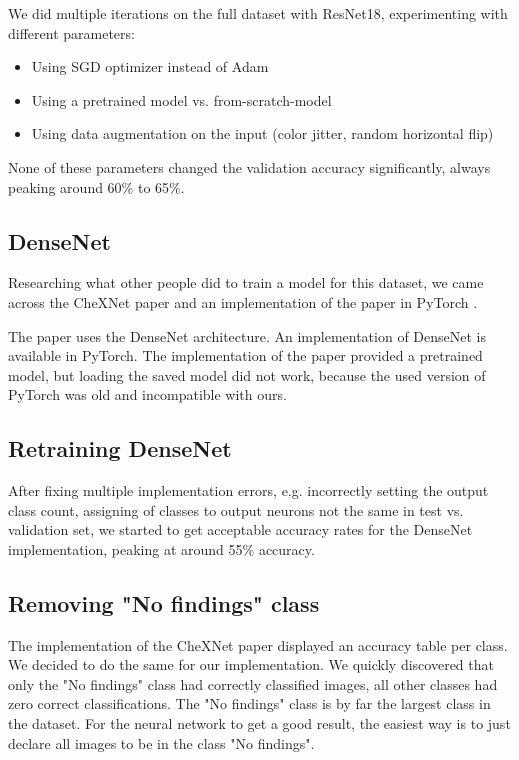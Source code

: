 We did multiple iterations on the full dataset with ResNet18, experimenting with different parameters:
\begin{itemize}
    \item Using SGD optimizer instead of Adam
    \item Using a pretrained model vs. from-scratch-model
    \item Using data augmentation on the input (color jitter, random horizontal flip)
\end{itemize}

None of these parameters changed the validation accuracy significantly, always peaking around 60\% to 65\%.

\subsection{DenseNet}

Researching what other people did to train a model for this dataset, we came across the CheXNet \cite{rajpurkar2017chexnet} paper and an implementation of the paper in PyTorch \cite{chexnetpytorch}.

The paper uses the DenseNet \cite{huang2017densely} architecture. An implementation of DenseNet is available in PyTorch. The implementation of the paper provided a pretrained model, but loading the saved model did not work, because the used version of PyTorch was old and incompatible with ours.

\subsection{Retraining DenseNet}

After fixing multiple implementation errors, e.g. incorrectly setting the output class count, assigning of classes to output neurons not the same in test vs. validation set, we started to get acceptable accuracy rates for the DenseNet implementation, peaking at around 55\% accuracy.

\subsection{Removing "No findings" class}
The implementation of the CheXNet paper displayed an accuracy table per class. We decided to do the same for our implementation. We quickly discovered that only the "No findings" class had correctly classified images, all other classes had zero correct classifications. The "No findings" class is by far the largest class in the dataset. For the neural network to get a good result, the easiest way is to just declare all images to be in the class "No findings".

